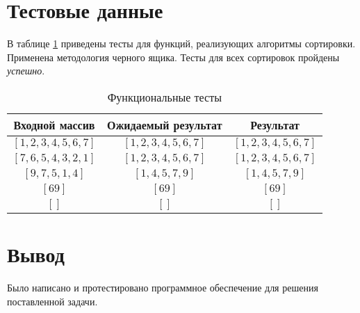 \section{Тестовые данные}

В таблице \ref{tbl:functional_test} приведены тесты для функций, реализующих алгоритмы сортировки. Применена методология черного ящика. Тесты для всех сортировок пройдены \textit{успешно}.



\begin{table}[ht!]
	\begin{center}
		\captionsetup{justification=raggedright,singlelinecheck=off}
		\caption{\label{tbl:functional_test} Функциональные тесты}
		\begin{tabular}{|c|c|c|}
			\hline
			Входной массив & Ожидаемый результат & Результат \\ 
			\hline
			$[1, 2, 3, 4, 5, 6, 7]$ & $[1, 2, 3, 4, 5, 6, 7]$  & $[1, 2, 3, 4, 5, 6, 7]$\\
			$[7, 6, 5, 4, 3, 2, 1]$  & $[1, 2, 3, 4, 5, 6, 7]$ & $[1, 2, 3, 4, 5, 6, 7]$\\
			$[9, 7, 5, 1, 4]$  & $[1, 4, 5, 7, 9]$  & $[1, 4, 5, 7, 9]$\\
			$[69]$  & $[69]$  & $[69]$\\
			$[]$  & $[]$  & $[]$\\
			\hline
		\end{tabular}
	\end{center}
\end{table}

\section*{Вывод}
Было написано и протестировано программное обеспечение для решения поставленной задачи.